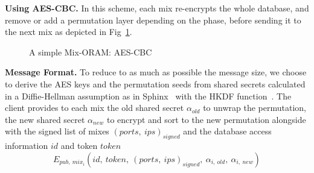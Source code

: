 \documentclass{llncs}
\begin{document}
\noindent\textbf{Using AES-CBC.} In this scheme, each mix re-encrypts the whole database, and remove or add a permutation layer depending on the phase, before sending it to the next mix as depicted in Fig~\ref{fig:ASMO_CBC}.\\
%
\begin{figure}
\centering
\begin{adjustbox}{width=\textwidth}
\end{adjustbox}
\caption{A simple Mix-ORAM: AES-CBC} \label{fig:ASMO_CBC}
\end{figure} 

\noindent\textbf{Message Format.}
To reduce to as much as possible the message size, we choose to derive the AES keys and the permutation seeds from shared secrets calculated in a Diffie-Hellman assumption as in Sphinx~\cite{danezis2009sphinx} with the HKDF function~\cite{krawczyk2010cryptographic}.
The client provides to each mix the old shared secret $\alpha_{old}$ to unwrap the permutation, the new shared secret $\alpha_{new}$ to encrypt and sort to the new permutation alongside with the signed list of mixes $(ports,\ ips)_{signed}$ and the database access information $id$ and token $token$
$$E_{pub,\ mix_i}\left ( id,\ token,\ (ports,\ ips)_{signed},\ \alpha_{i,\ old},\ \alpha_{i,\ new} \right) $$
\end{document}
